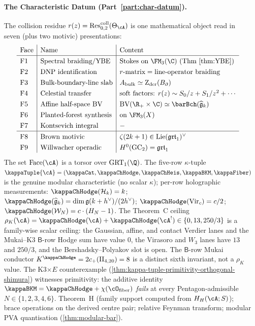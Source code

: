 \paragraph{The Characteristic Datum
(Part~\ref{part:char-datum}).}
The collision residue
$r(z) = \Res^{\mathrm{coll}}_{0,2}(\Theta_\cA)$ is one
mathematical object read in seven \textup{(}plus two motivic\textup{)}
presentations:
\[
\renewcommand{\arraystretch}{1.3}
\begin{array}{l|l|l}
\text{Face} & \text{Name} & \text{Content} \\
\hline
\text{F1} & \text{Spectral braiding/YBE} &
 \text{Stokes on } \FM_3(\C)\ (\text{Thm~\ref{thm:YBE}}) \\
\text{F2} & \text{DNP identification} &
 r\text{-matrix} = \text{line-operator braiding} \\
\text{F3} & \text{Bulk-boundary-line slab} &
 \Abulk \simeq \Zder(\Bbound) \\
\text{F4} & \text{Celestial transfer} &
 \text{soft factors: } r(z) \sim S_0/z + S_1/z^2 + \cdots \\
\text{F5} & \text{Affine half-space BV} &
 \text{BV}(\R_+ \times \C) \simeq \barBch(\widehat{\fg}_k) \\
\text{F6} & \text{Planted-forest synthesis} &
 \text{on } \FM_3(X) \\
\text{F7} & \text{Kontsevich integral} & - \\
\hline
\text{F8} & \text{Brown motivic} &
 \zeta(2k+1) \in \operatorname{Lie}(\mathfrak{grt}_1)^\vee \\
\text{F9} & \text{Willwacher operadic} &
 H^0(\mathrm{GC}_2) = \mathfrak{grt}_1
\end{array}
\]
The set $\operatorname{Face}(\cA)$ is a torsor over
$\mathrm{GRT}_1(\Q)$. The five-row $\kappa$-tuple
$\kappaTuple{\cA} =
(\kappaCat, \kappaChHodge, \kappaChHeis, \kappaBKM, \kappaFiber)$
is the genuine modular characteristic
\textup{(}no scalar $\kappa$\textup{)}; per-row holographic measurements:
$\kappaChHodge(\cH_k) = k$;
$\kappaChHodge(\widehat{\fg}_k) = \dim\fg(k+h^\vee)/(2h^\vee)$;
$\kappaChHodge(\mathrm{Vir}_c) = c/2$;
$\kappaChHodge(\cW_N) = c \cdot (H_N - 1)$. The Theorem~C
ceiling
$\rho_K(\cA) = \kappaChHodge(\cA) + \kappaChHodge(\cA^!) \in
\{0, 13, 250/3\}$ is a family-wise scalar ceiling: the
Gaussian, affine, and contact Verdier lanes and the Mukai--K3
\(\mathsf B\)-row Hodge sum have value \(0\), the Virasoro and
\(W_3\) lanes have \(13\) and \(250/3\), and the
Bershadsky--Polyakov slot is open. The \(\mathsf B\)-row Mukai
conductor \(K^{\kappaChHodge} = 2c_+(\mathrm{II}_{4,20}) = 8\)
is a distinct sixth invariant, not a \(\rho_K\) value.
The K3$\times E$ counterexample
\textup{(}\cref{thm:kappa-tuple-primitivity-orthogonal-shimura}\textup{)}
witnesses primitivity: the additive
identity $\kappaBKM = \kappaChHodge + \chi(\cO_{\mathrm{fiber}})$
\emph{fails} at every Pentagon-admissible $N \in \{1, 2, 3, 4, 6\}$.
Theorem~H (family support computed from $H_H(\cA;S)$); brace
operations on the derived centre pair;
relative Feynman transform; modular PVA quantisation
\textup{(}\cref{thm:modular-bar}\textup{)}.

